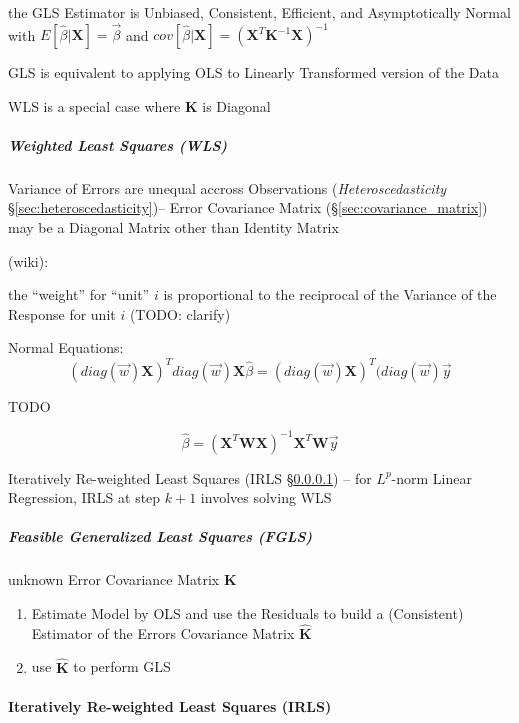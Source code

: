 the GLS Estimator is Unbiased, Consistent, Efficient, and Asymptotically Normal
with $E[\hat{\beta} | \mathbf{X}] = \vec{\beta}$ and
$cov[\hat{\beta} | \mathbf{X}] = (\mathbf{X}^T \mathbf{K}^{-1} \mathbf{X})^{-1}$

GLS is equivalent to applying OLS to Linearly Transformed version of the Data

WLS is a special case where $\mathbf{K}$ is Diagonal



\subparagraph{Weighted Least Squares (WLS)}\label{sec:wls}\hfill

Variance of Errors are unequal accross Observations (\emph{Heteroscedasticity}
\S\ref{sec:heteroscedasticity})-- Error Covariance Matrix
(\S\ref{sec:covariance_matrix}) may be a Diagonal Matrix other than Identity
Matrix

(wiki):

the ``weight'' for ``unit'' $i$ is proportional to the reciprocal of the
Variance of the Response for unit $i$ (TODO: clarify)

Normal Equations:
\[
  (diag(\vec{w})\mathbf{X})^T diag(\vec{w})\mathbf{X} \hat{\beta}
    = (diag(\vec{w})\mathbf{X})^T (diag(\vec{w})\vec{y}
\]

TODO

\[
  \hat{\beta} = (\mathbf{X}^T \mathbf{W X})^{-1} \mathbf{X}^T \mathbf{W} \vec{y}
\]

\fist Iteratively Re-weighted Least Squares (IRLS \S\ref{sec:irls}) -- for
$L^p$-norm Linear Regression, IRLS at step $k+1$ involves solving WLS



\subparagraph{Feasible Generalized Least Squares (FGLS)}\label{sec:fgls}\hfill

unknown Error Covariance Matrix $\mathbf{K}$

\begin{enumerate}
  \item Estimate Model by OLS and use the Residuals to build a (Consistent)
    Estimator of the Errors Covariance Matrix $\hat{\mathbf{K}}$
  \item use $\hat{\mathbf{K}}$ to perform GLS
\end{enumerate}



\paragraph{Iteratively Re-weighted Least Squares (IRLS)}\label{sec:irls}\hfill

